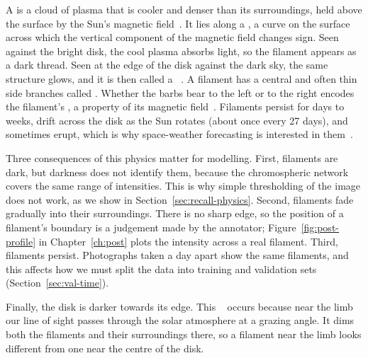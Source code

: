 A  is a cloud of plasma that is cooler and denser than its surroundings, held
above the surface by the Sun's magnetic field~\citep{mackay2010}. It lies along a
, a curve on the surface across which the vertical component of
the magnetic field changes sign. Seen against the bright disk, the cool plasma absorbs \Ha{}
light, so the filament appears as a dark thread. Seen at the edge of the disk against the dark
sky, the same structure glows, and it is then called a ~\citep{parenti2014}. A
filament has a central  and often thin side branches called .
Whether the barbs bear to the left or to the right encodes the filament's , a
property of its magnetic field~\citep{martin1998}. Filaments persist for days to weeks, drift
across the disk as the Sun rotates (about once every 27 days), and sometimes erupt, which is why
space-weather forecasting is interested in them~\citep{webb2012,magfilo}.

Three consequences of this physics matter for modelling. First, filaments are dark, but darkness
does not identify them, because the chromospheric network covers the same range of intensities.
This is why simple thresholding of the image does not work, as we show in
Section~\ref{sec:recall-physics}. Second, filaments fade gradually into their surroundings. There
is no sharp edge, so the position of a filament's boundary is a judgement made by the annotator;
Figure~\ref{fig:post-profile} in Chapter~\ref{ch:post} plots the intensity across a real
filament. Third, filaments persist. Photographs taken a day apart show the same filaments, and
this affects how we must split the data into training and validation sets
(Section~\ref{sec:val-time}).

Finally, the disk is darker towards its edge. This ~\citep{stix2002} occurs because near
the limb our line of sight passes through the solar atmosphere at a grazing angle. It dims both
the filaments and their surroundings there, so a filament near the limb looks different from one
near the centre of the disk.

